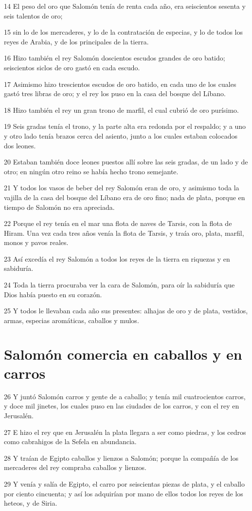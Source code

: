 \par 14 El peso del oro que Salomón tenía de renta cada año, era seiscientos sesenta y seis talentos de oro;
\par 15 sin lo de los mercaderes, y lo de la contratación de especias, y lo de todos los reyes de Arabia, y de los principales de la tierra.
\par 16 Hizo también el rey Salomón doscientos escudos grandes de oro batido; seiscientos siclos de oro   gastó en cada escudo.
\par 17 Asimismo hizo trescientos escudos de oro batido, en cada uno de los cuales gastó tres libras de oro; y el rey los puso en la casa del bosque del Líbano.
\par 18 Hizo también el rey un gran trono de marfil, el cual cubrió de oro purísimo.
\par 19 Seis gradas tenía el trono, y la parte alta era redonda por el respaldo; y a uno y otro lado tenía brazos cerca del asiento, junto a los cuales estaban colocados dos leones.
\par 20 Estaban también doce leones puestos allí sobre las seis gradas, de un lado y de otro; en ningún otro reino se había hecho trono semejante.
\par 21 Y todos los vasos de beber del rey Salomón eran de oro, y asimismo toda la vajilla de la casa del bosque del Líbano era de oro fino; nada de plata, porque en tiempo de Salomón no era apreciada.
\par 22 Porque el rey tenía en el mar una flota de naves de Tarsis, con la flota de Hiram. Una vez cada tres años venía la flota de Tarsis, y traía oro, plata, marfil, monos y pavos reales.
\par 23 Así excedía el rey Salomón a todos los reyes de la tierra en riquezas y en sabiduría.
\par 24 Toda la tierra procuraba ver la cara de Salomón, para oír la sabiduría que Dios había puesto en su corazón.
\par 25 Y todos le llevaban cada año sus presentes: alhajas de oro y de plata, vestidos, armas, especias aromáticas, caballos y mulos.

\section*{Salomón comercia en caballos y en carros}

\par 26 Y juntó Salomón carros y gente de a caballo; y tenía mil cuatrocientos carros, y doce mil jinetes, los cuales puso en las ciudades de los carros, y con el rey en Jerusalén.
\par 27 E hizo el rey que en Jerusalén la plata llegara a ser como piedras, y los cedros como cabrahigos de la Sefela en abundancia.
\par 28 Y traían de Egipto caballos y lienzos a Salomón; porque la compañía de los mercaderes del rey compraba caballos y lienzos.
\par 29 Y venía y salía de Egipto, el carro por seiscientas piezas de plata, y el caballo por ciento cincuenta; y así los adquirían por mano de ellos todos los reyes de los heteos, y de Siria.

